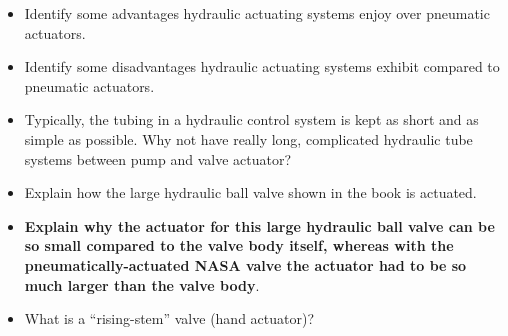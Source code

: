 \begin{itemize}
\item{} Identify some advantages hydraulic actuating systems enjoy over pneumatic actuators.
\item{} Identify some disadvantages hydraulic actuating systems exhibit compared to pneumatic actuators.
\item{} Typically, the tubing in a hydraulic control system is kept as short and as simple as possible.  Why not have really long, complicated hydraulic tube systems between pump and valve actuator?
\item{} Explain how the large hydraulic ball valve shown in the book is actuated.
\item{} {\bf Explain why the actuator for this large hydraulic ball valve can be so small compared to the valve body itself, whereas with the pneumatically-actuated NASA valve the actuator had to be so much larger than the valve body}.
\item{} What is a ``rising-stem'' valve (hand actuator)?
\end{itemize}








